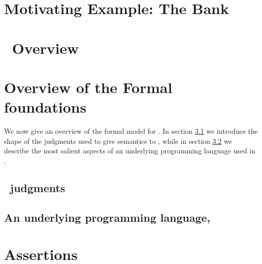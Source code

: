 \documentclass[runningheads]{llncs}
\begin{document}
\section{Motivating Example: The Bank}
\label{sect:motivate:Bank}




\section{\Chainmail\ Overview}
\label{sect:chainmail}



\section{Overview of the Formal foundations}
\label{sect:formal}
We now give an overview of the formal model for \Chainmail. In section \ref{sect:overviewmodel} we 
introduce  the shape of the judgments used to give semantics to \Chainmail, while in section \ref{sect:PL} 
we describe the most salient aspects of an underlying programming language used in \Chainmail.

\subsection{\Chainmail\ judgments}
\label{sect:overviewmodel}


\subsection{An underlying programming language, \LangOO}
\label{sect:PL}


\section{Assertions}
\label{sect:assertions}




\end{document}
